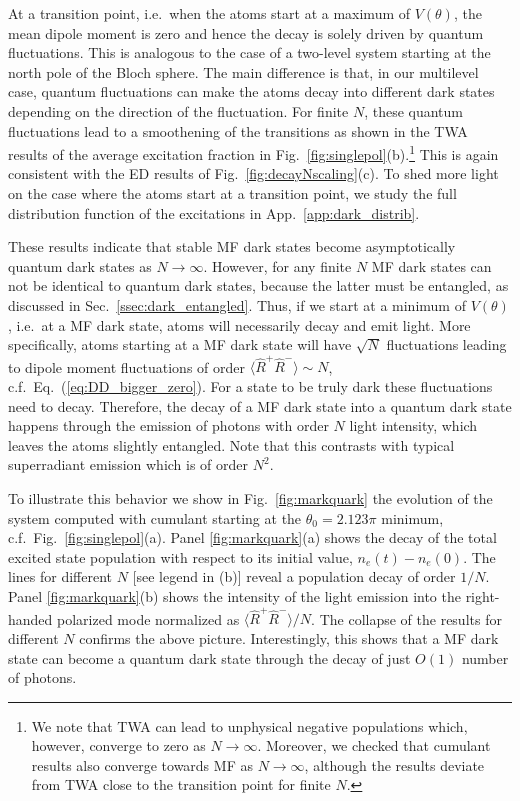\documentclass[aps,prx,superscriptaddress,twocolumn,notitlepage,nofootinbib,longbibliography]{revtex4-2}
\begin{document}
At a transition point, i.e.~when the atoms start at a maximum of $V(\theta)$, the mean dipole moment is zero and hence the decay is solely driven by quantum fluctuations. This is analogous to the case of a two-level system starting at the north pole of the Bloch sphere.
The main difference is that, in our multilevel case, quantum fluctuations can make the atoms decay into different dark states depending on the 
direction of the fluctuation.
For finite $N$, these quantum fluctuations lead to a smoothening of the transitions as shown in the TWA results of the average excitation fraction in Fig.~\ref{fig:singlepol}(b).\footnote{We note that TWA can lead to unphysical negative populations which, however, converge to zero as $N\rightarrow\infty$. Moreover, we checked that cumulant results also converge towards MF as $N\rightarrow\infty$, although the results deviate from TWA close to the transition point for finite $N$.}
This is again consistent with the ED results of Fig.~\ref{fig:decayNscaling}(c).
To shed more light on the case where the atoms start at a transition point, we study the full distribution function of the excitations in App.~\ref{app:dark_distrib}.

These results indicate that stable MF dark states become asymptotically quantum dark states as $N\rightarrow\infty$. However, for any finite $N$ MF dark states can not be identical to quantum dark states, because the latter must be entangled, as discussed in Sec.~\ref{ssec:dark_entangled}. Thus, if we start at a minimum of $V(\theta)$, i.e.~at a MF dark state, atoms will necessarily decay and emit light. More specifically, atoms starting at a MF dark state will have $\sqrt{N}$ fluctuations leading to dipole moment fluctuations of order $\langle \hat{R}^+\hat{R}^- \rangle \sim N$, c.f.~Eq.~(\ref{eq:DD_bigger_zero}).
For a state to be truly dark these fluctuations need to decay. Therefore, the decay of a MF dark state into a quantum dark state happens through the emission of photons with order $N$ light intensity, which leaves the atoms slightly entangled. Note that this contrasts with typical superradiant emission which is of order $N^2$.

To illustrate this behavior we show in Fig.~\ref{fig:markquark} the evolution of the system computed with cumulant starting at the $\theta_0=2.123\pi$ minimum, c.f.~Fig.~\ref{fig:singlepol}(a). Panel \ref{fig:markquark}(a) shows the decay of the total excited state population with respect to its initial value, $n_e(t)-n_e(0)$. The lines for different $N$ [see legend in (b)] reveal a population decay of order $1/N$.
Panel \ref{fig:markquark}(b) shows the intensity of the light emission into the right-handed polarized mode normalized as $\langle \hat{R}^+\hat{R}^- \rangle / N$. The collapse of the results for different $N$ confirms the above picture.
Interestingly, this shows that a MF dark state can become a quantum dark state through the decay of just $O(1)$ number of photons.
\end{document}
